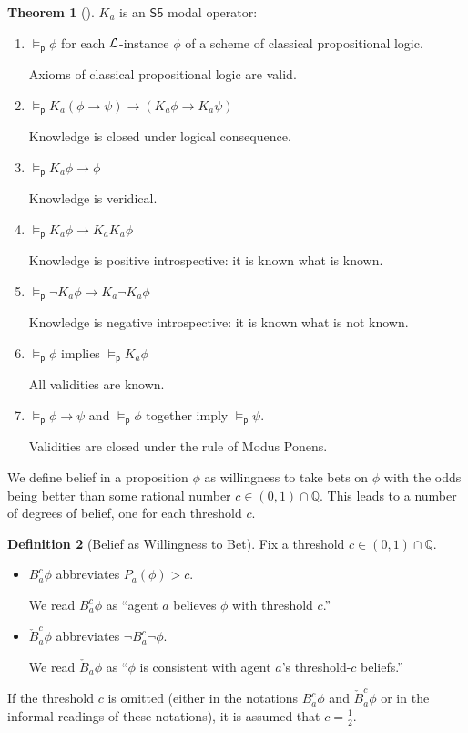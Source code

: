 \documentclass[12pt]{article}
\theoremstyle{definition}
\newtheorem{theorem}{Theorem}[section]
\newtheorem{definition}[theorem]{Definition}
\newcommand{\Rat}{\mathbb{Q}}  %
\newcommand{\Lang}{{\cal L}}   %
\newcommand{\modelsp}{\models_{\mathsf{p}}}                  %
\begin{document}
\begin{theorem}[\cite{Eijck2013:lap}]
  \label{theorem:knowledge}
  $K_a$ is an $\mathsf{S5}$ modal operator:
  \begin{enumerate}
  \item $\modelsp \phi$ for each $\Lang$-instance $\phi$ of a scheme
    of classical propositional logic.

    Axioms of classical propositional logic are valid.

  \item $\modelsp K_a(\phi\to\psi)\to(K_a\phi\to K_a\psi)$
    
    Knowledge is closed under logical consequence.

  \item $\modelsp K_a\phi\to \phi$

    Knowledge is veridical.
    
  \item $\modelsp K_a\phi\to K_aK_a\phi$

    Knowledge is positive introspective:  it is known what is known.
    
  \item $\modelsp \lnot K_a\phi\to K_a\lnot K_a\phi$

    Knowledge is negative introspective: it is known what is not
    known.
    
  \item $\modelsp\phi$ implies $\modelsp K_a\phi$

    All validities are known.

  \item $\modelsp\phi\to\psi$ and $\modelsp\phi$ together imply
    $\modelsp\psi$.

    Validities are closed under the rule of Modus Ponens.
  \end{enumerate}
\end{theorem}

We define belief in a proposition $\phi$ as willingness to take bets
on $\phi$ with the odds being better than some rational number
$c\in(0,1)\cap\Rat$.  This leads to a number of degrees of belief, one
for each threshold $c$.

\begin{definition}[Belief as Willingness to Bet]
  \label{definition:belief}
  Fix a threshold $c\in(0,1)\cap\Rat$.
  \begin{itemize}
  \item $B_a^c\phi$ abbreviates $P_a(\phi)>c$.

    We read $B_a^c\phi$ as ``agent $a$ believes $\phi$ with threshold
    $c$.''

  \item $\check B_a^c\phi$ abbreviates $\lnot B_a^c\lnot\phi$.

    We read $\check B_a\phi$ as ``$\phi$ is consistent with agent
    $a$'s threshold-$c$ beliefs.''
  \end{itemize}
  If the threshold $c$ is omitted (either in the notations $B_a^c\phi$
  and $\check B_a^c\phi$ or in the informal readings of these
  notations), it is assumed that $c=\frac 12$.
\end{definition}
\end{document}
